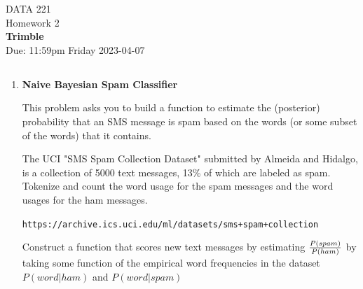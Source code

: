 \documentclass[12pt]{book}
\theoremstyle{definition}
\begin{document}
\begin{center}
{\Large DATA 221 \\  Homework 2  }\\
\textbf{ Trimble}\\ %
Due: 11:59pm  Friday 2023-04-07 
\end{center}

\vspace{0.2 cm}

\subsection*{   }

\begin{enumerate}

%


\item


\textbf{Naive Bayesian Spam Classifier}

This problem asks you to build a function to estimate the (posterior) probability that an SMS message is spam based on the words (or some subset of the words) that it contains.

The UCI "SMS Spam Collection Dataset" submitted by Almeida and Hidalgo,  is a collection of 5000 text messages, 13\% of which are labeled as spam.  Tokenize and count the word usage for the spam messages and the word usages for the ham messages.

\texttt{https://archive.ics.uci.edu/ml/datasets/sms+spam+collection}

Construct a function that scores new text messages by estimating $ {P (spam ) \over P(ham) } $ by taking some function of the empirical word frequencies in the dataset $P (word | ham)$ and $P( word | spam ) $ 


\end{enumerate}
\end{document}
